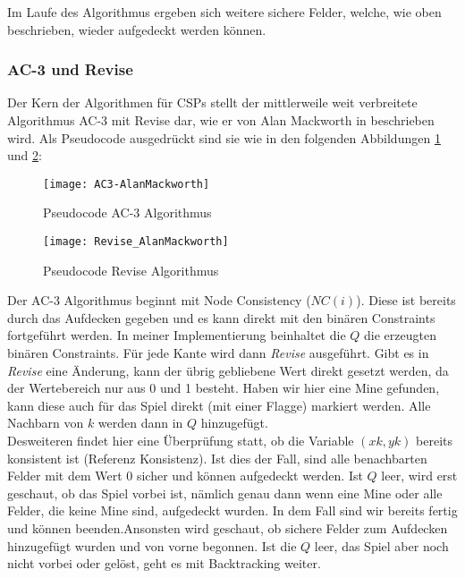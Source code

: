 Im Laufe des Algorithmus ergeben sich weitere sichere Felder, welche, wie oben beschrieben, wieder aufgedeckt werden können.

\subsubsection{AC-3 und Revise}

Der Kern der Algorithmen für CSPs stellt der mittlerweile weit verbreitete Algorithmus AC-3 mit Revise dar, wie er von Alan Mackworth in 
\cite{Alan} beschrieben wird. Als Pseudocode ausgedrückt sind sie wie in den folgenden Abbildungen \ref{AC3} und \ref{Revise}:

\begin{figure}[!htb]
    \centering
    \texttt{[image: AC3-AlanMackworth]}
    \caption{Pseudocode AC-3 Algorithmus}\label{AC3}
\end{figure}
\begin{figure}[!htb]
    \centering
    \texttt{[image: Revise\_AlanMackworth]}
    \caption{Pseudocode Revise Algorithmus}\label{Revise}
\end{figure}

Der AC-3 Algorithmus beginnt mit Node Consistency ($NC(i)$). Diese ist bereits durch das Aufdecken gegeben und es kann direkt mit den
binären Constraints fortgeführt werden. In meiner Implementierung beinhaltet die $Q$ die erzeugten binären Constraints. Für jede Kante wird
dann \textit{Revise} ausgeführt.
Gibt es in \textit{Revise} eine Änderung, kann der übrig gebliebene Wert direkt gesetzt werden, da der 
Wertebereich nur aus 0 und 1 besteht. Haben wir hier eine Mine gefunden, kann diese auch für das Spiel direkt (mit einer Flagge) markiert
werden. Alle Nachbarn von $k$ werden dann in $Q$ hinzugefügt.\\ Desweiteren findet hier eine Überprüfung statt, ob die Variable $(xk, yk)$ bereits
konsistent ist (Referenz Konsistenz). Ist dies der Fall, sind alle benachbarten Felder mit dem Wert 0 sicher und können aufgedeckt werden.
Ist $Q$ leer, wird erst geschaut, ob das Spiel vorbei ist, nämlich genau dann wenn eine Mine oder alle Felder, die keine Mine sind, aufgedeckt
wurden. In dem Fall sind wir bereits fertig und können beenden.\clearpage Ansonsten wird geschaut, ob sichere Felder zum Aufdecken hinzugefügt wurden
und von vorne begonnen. Ist die $Q$ leer, das Spiel aber noch nicht vorbei oder gelöst, geht es mit Backtracking weiter.

